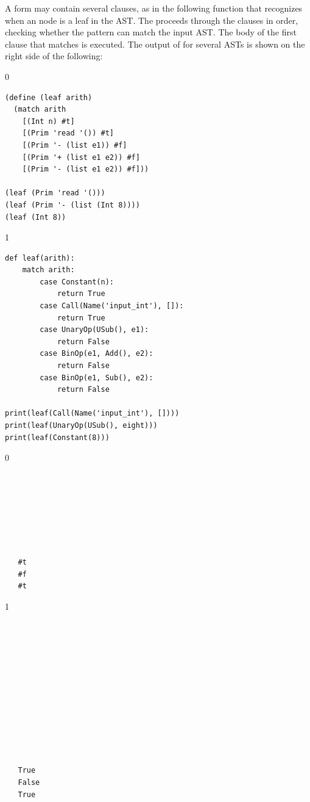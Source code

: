 \documentclass[7x10]{TimesAPriori_MIT}%
\def\racketEd{0}
\def\pythonEd{1}
\def\edition{1}
\newcommand{\pythonColor}[0]{}
\numberwithin{theorem}{chapter}
\numberwithin{definition}{chapter}
\numberwithin{equation}{chapter}
\begin{document}
A  form may contain several clauses, as in the following
function  that recognizes when an \LangInt{} node is a leaf in
the AST. The  proceeds through the clauses in order,
checking whether the pattern can match the input AST. The body of the
first clause that matches is executed. The output of  for
several ASTs is shown on the right side of the following:
\begin{center}
\begin{minipage}{0.6\textwidth}
{\if\edition\racketEd
\begin{lstlisting}
(define (leaf arith)
  (match arith
    [(Int n) #t]
    [(Prim 'read '()) #t]
    [(Prim '- (list e1)) #f]
    [(Prim '+ (list e1 e2)) #f]
    [(Prim '- (list e1 e2)) #f]))

(leaf (Prim 'read '()))
(leaf (Prim '- (list (Int 8))))
(leaf (Int 8))
\end{lstlisting}
\fi}
{\if\edition\pythonEd\pythonColor
\begin{lstlisting}
def leaf(arith):
    match arith:
        case Constant(n):
            return True
        case Call(Name('input_int'), []):
            return True
        case UnaryOp(USub(), e1):
            return False
        case BinOp(e1, Add(), e2):
            return False
        case BinOp(e1, Sub(), e2):
            return False

print(leaf(Call(Name('input_int'), [])))
print(leaf(UnaryOp(USub(), eight)))
print(leaf(Constant(8)))
\end{lstlisting}
\fi}
\end{minipage}
\vrule
\begin{minipage}{0.25\textwidth}
{\if\edition\racketEd  
  \begin{lstlisting}






    
   #t
   #f
   #t
\end{lstlisting}
  \fi}
{\if\edition\pythonEd\pythonColor
\begin{lstlisting}






    




   
   True
   False
   True
\end{lstlisting}
\fi}
\end{minipage}
\end{center}
\end{document}
